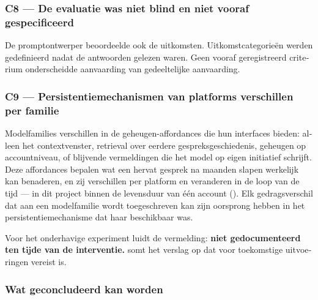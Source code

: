 \begin{dutch}
\subsubsection*{C8 — De evaluatie was niet blind en niet vooraf gespecificeerd}
\label{sec:nl:x-c8-de-evaluatie-was-niet-blind-en-niet-v}

De promptontwerper beoordeelde ook de uitkomsten. Uitkomstcategorieën werden gedefinieerd nadat de antwoorden gelezen waren. Geen vooraf geregistreerd criterium onderscheidde aanvaarding van gedeeltelijke aanvaarding.


\subsubsection*{C9 — Persistentiemechanismen van platforms verschillen per familie}
\label{sec:nl:x-c9-persistentiemechanismen-van-platforms}

Modelfamilies verschillen in de geheugen-affordances die hun interfaces bieden: alleen het contextvenster, retrieval over eerdere gespreksgeschiedenis, geheugen op accountniveau, of blijvende vermeldingen die het model op eigen initiatief schrijft. Deze affordances bepalen wat een hervat gesprek na maanden slapen werkelijk kan benaderen, en zij verschillen per platform en veranderen in de loop van de tijd — in dit project binnen de levensduur van één account (). Elk gedragsverschil dat aan een modelfamilie wordt toegeschreven kan zijn oorsprong hebben in het persistentiemechanisme dat haar beschikbaar was.

Voor het onderhavige experiment luidt de vermelding: \textbf{niet gedocumenteerd ten tijde van de interventie.}  somt het verslag op dat voor toekomstige uitvoeringen vereist is.


\subsubsection*{Wat geconcludeerd kan worden}
\label{sec:nl:x-wat-geconcludeerd-kan-worden}


\end{dutch}
